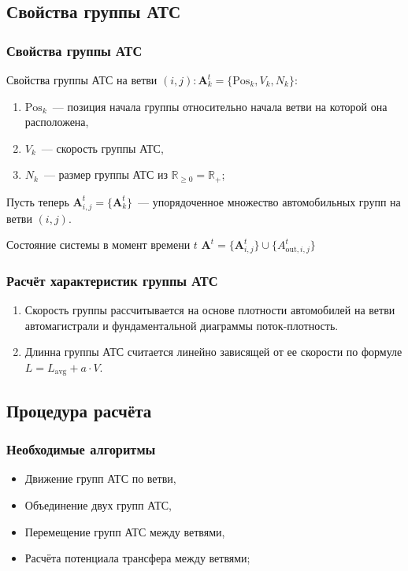 \subsection{Свойства группы АТС}
\begin{frame}
    \frametitle{Свойства группы АТС}
    Свойства группы АТС на ветви \((i, j): \mathbf{A}^t_k = \{\mathrm{Pos}_k, V_k, N_k\}:\)
    \begin{enumerate}
        \item \(\mathrm{Pos}_k\)~--- позиция начала группы относительно начала ветви на которой она расположена,
        \item \(V_k\)~--- скорость группы АТС,
        \item \(N_k\)~--- размер группы АТС из \(\mathbb{R}_{\geq 0} = \mathbb{R}_+\);
    \end{enumerate}

    Пусть теперь \(\mathbf{A}^t_{i,j} = \{\mathbf{A}^t_k\}\)~--- упорядоченное множество автомобильных групп на ветви \((i,j)\).

    \begin{block}{Состояние системы в момент времени \(t\)}
    \(\mathbf{A}^t = \{\mathbf{A}^t_{i,j}\} \cup \{A^t_{\text{out}, i, j}\}\)
    \end{block}
\end{frame}

\begin{frame}
    \frametitle{Расчёт характеристик группы АТС}
    \begin{enumerate}
      \item Скорость группы рассчитывается на основе плотности автомобилей на ветви автомагистрали и фундаментальной диаграммы поток-плотность.
      \item Длинна группы АТС считается линейно зависящей от ее скорости по формуле \(L = L_\text{avg} + a\cdot V\).
    \end{enumerate}
\end{frame}


\subsection{Процедура расчёта}
\begin{frame}
    \frametitle{Необходимые алгоритмы}
    \begin{itemize}
        \item Движение групп АТС по ветви,
        \item Объединение двух групп АТС,
        \item Перемещение групп АТС между ветвями,
        \item Расчёта потенциала трансфера между ветвями;
    \end{itemize}
\end{frame}

